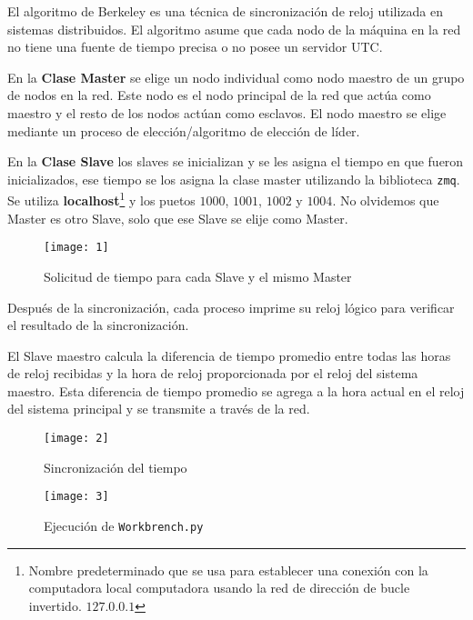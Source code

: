 El algoritmo de Berkeley es una técnica de sincronización de reloj utilizada en
sistemas distribuidos. El algoritmo asume que cada nodo de la máquina en la red
no tiene una fuente de tiempo precisa o no posee un servidor UTC.\@

En la \textbf{Clase Master} se elige un nodo individual como nodo maestro de un
grupo de nodos en la red. Este nodo es el nodo principal de la red que actúa
como maestro y el resto de los nodos actúan como esclavos. El nodo maestro se
elige mediante un proceso de elección/algoritmo de elección de líder.

En la \textbf{Clase Slave} los slaves se inicializan y se les asigna el tiempo
en que fueron inicializados, ese tiempo se los asigna la clase master utilizando
la biblioteca \texttt{zmq}.
Se utiliza \textbf{localhost}\footnote{Nombre predeterminado que se usa para establecer
  una conexión con la computadora local computadora usando la red de dirección
  de bucle invertido. $127.0.0.1$} y los puetos $1000$, $1001$, $1002$ y $1004$.
No olvidemos que Master es otro Slave, solo que ese Slave se elije como Master.

\begin{figure}[H]
  \centering
  \texttt{[image: 1]}
  \caption{Solicitud de tiempo para cada Slave y el mismo Master}\label{fig:1}
\end{figure}

Después de la sincronización, cada proceso imprime su reloj lógico para
verificar el resultado de la sincronización.

El Slave maestro calcula la diferencia de tiempo promedio entre todas las horas
de reloj recibidas y la hora de reloj proporcionada por el reloj del sistema
maestro. Esta diferencia de tiempo promedio se agrega a la hora actual en el
reloj del sistema principal y se transmite a través de la red.

\begin{figure}[H]
  \centering
  \texttt{[image: 2]}
  \caption{Sincronización del tiempo}\label{fig:2}
\end{figure}

\begin{figure}[H]
  \centering
  \texttt{[image: 3]}
  \caption{Ejecución de \texttt{Workbrench.py}}\label{fig:3}
\end{figure}



